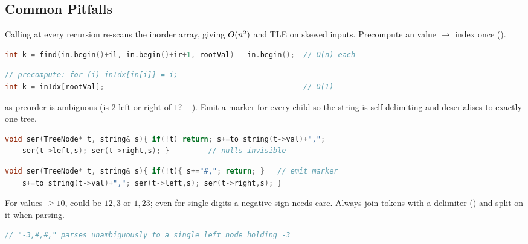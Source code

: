 \subsection{Common Pitfalls}\label{sec:c03-rebuild-pitfalls}

\begin{warningbox}
Calling  at every recursion re-scans the inorder
array, giving $O(n^2)$ and TLE on skewed inputs. Precompute an
 value $\to$ index once ().
\end{warningbox}
\begin{lstlisting}[caption={\textcolor{warningred}{WRONG}: $\bigO{n}$ split-search per node}, language=C++, basicstyle=\ttfamily\small]
int k = find(in.begin()+il, in.begin()+ir+1, rootVal) - in.begin();  // O(n) each
\end{lstlisting}
\begin{lstlisting}[caption={\textcolor{successgreen}{RIGHT}: one-time index map, $\bigO{1}$ split}, language=C++, basicstyle=\ttfamily\small]
// precompute: for (i) inIdx[in[i]] = i;
int k = inIdx[rootVal];                                              // O(1)
\end{lstlisting}

\begin{warningbox}
 as preorder is ambiguous (is $2$ left or right of $1$? -- ).
Emit a marker for every \nil{} child so the string is self-delimiting and deserialises to
exactly one tree.
\end{warningbox}
\begin{lstlisting}[caption={\textcolor{warningred}{WRONG}: bare preorder -- cannot decode one-child nodes}, language=C++, basicstyle=\ttfamily\small]
void ser(TreeNode* t, string& s){ if(!t) return; s+=to_string(t->val)+",";
    ser(t->left,s); ser(t->right,s); }         // nulls invisible
\end{lstlisting}
\begin{lstlisting}[caption={\textcolor{successgreen}{RIGHT}: mark the nulls}, language=C++, basicstyle=\ttfamily\small]
void ser(TreeNode* t, string& s){ if(!t){ s+="#,"; return; }   // emit marker
    s+=to_string(t->val)+","; ser(t->left,s); ser(t->right,s); }
\end{lstlisting}

\begin{warningbox}
For values $\ge 10$,  could be $12,3$ or $1,23$; even for single digits a
negative sign needs care. Always join tokens with a delimiter (\code{,}) and split on it
when parsing.
\end{warningbox}
\begin{lstlisting}[caption={\textcolor{successgreen}{RIGHT}: delimited tokens survive multi-digit and negative values}, language=C++, basicstyle=\ttfamily\small]
// "-3,#,#," parses unambiguously to a single left node holding -3
\end{lstlisting}


